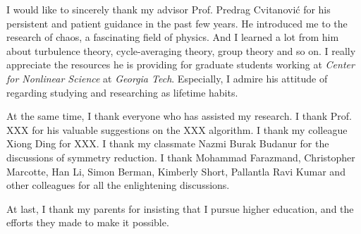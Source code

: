 

I would like to sincerely thank my advisor Prof. Predrag Cvitanovi\'c for
his persistent and patient guidance in the past few years.
He introduced me to the research of chaos, a fascinating field of
physics. And I learned a lot from him about turbulence theory,
cycle-averaging theory, group theory and so on. I really
appreciate the resources he is providing for graduate students
working at \emph{Center for Nonlinear Science} at \emph{Georgia Tech}.
Especially, I admire his attitude of regarding studying and researching
as lifetime habits.

At the same time, I thank everyone who has assisted my research.
I thank Prof. XXX for his valuable suggestions on the XXX
algorithm.
I thank my colleague Xiong Ding for XXX.
I thank my classmate Nazmi Burak Budanur for the
discussions of symmetry reduction.
I thank Mohammad Farazmand, Christopher Marcotte, Han Li,
Simon Berman, Kimberly Short,
Pallantla Ravi Kumar and other colleagues
for all the enlightening discussions.


At last, I thank my parents for insisting that I pursue
higher education, and the efforts they made to make it possible.
